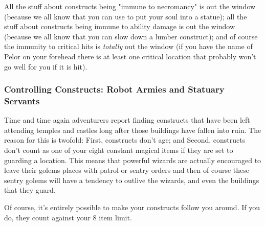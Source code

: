 All the stuff about constructs being "immune to necromancy" is out the window (because we all know that you can use  to put your soul into a statue); all the stuff about constructs being immune to ability damage is out the window (because we all know that you can slow down a lumber construct); and of course the immunity to critical hits is \textit{totally} out the window (if you have the name of Pelor on your forehead there is at least one critical location that probably won't go well for you if it is hit).

\subsubsection{Controlling Constructs: Robot Armies and Statuary Servants}

Time and time again adventurers report finding constructs that have been left attending temples and castles long after those buildings have fallen into ruin. The reason for this is twofold: First, constructs don't age; and Second, constructs don't count as one of your eight constant magical items if they are set to guarding a location. This means that powerful wizards are actually encouraged to leave their golems places with patrol or sentry orders and then of course these sentry golems will have a tendency to outlive the wizards, and even the buildings that they guard.

Of course, it's entirely possible to make your constructs follow you around. If you do, they count against your 8 item limit.


